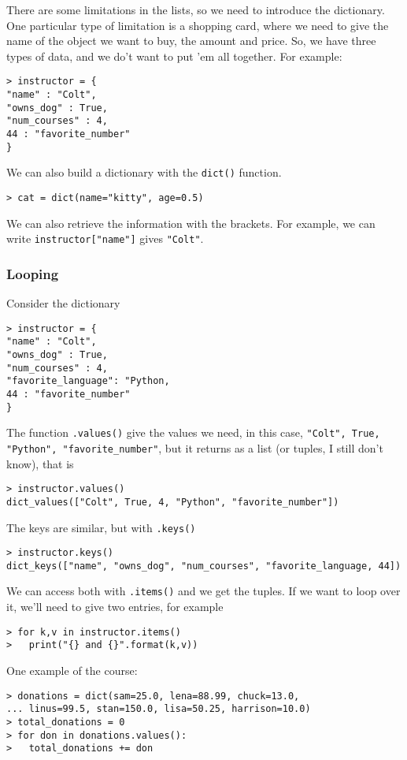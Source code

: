 There are some limitations in the lists, so we need to introduce the dictionary. One particular type of limitation is a shopping card, where we need to give the name of the object we want to buy, the amount and price. So, we have three types of data, and we do't want to put 'em all together. For example:
\begin{verbatim}
> instructor = {
"name" : "Colt", 
"owns_dog" : True,
"num_courses" : 4, 
44 : "favorite_number"
}
\end{verbatim}
We can also build a dictionary with the \verb|dict()| function. 
\begin{verbatim}
> cat = dict(name="kitty", age=0.5)
\end{verbatim}
We can also retrieve the information with the brackets. For example, we can write \verb|instructor["name"]| gives \verb|"Colt"|.

\subsubsection{Looping} Consider the dictionary
\begin{verbatim}
> instructor = {
"name" : "Colt", 
"owns_dog" : True,
"num_courses" : 4, 
"favorite_language": "Python,
44 : "favorite_number"
}
\end{verbatim}
The function \verb|.values()| give the values we need, in this case, \verb|"Colt", True, "Python", "favorite_number"|, but it returns as a list (or tuples, I still don't know), that is 
\begin{verbatim}
> instructor.values()
dict_values(["Colt", True, 4, "Python", "favorite_number"])
\end{verbatim}

The keys are similar, but with \verb|.keys()|
\begin{verbatim}
> instructor.keys()
dict_keys(["name", "owns_dog", "num_courses", "favorite_language, 44])
\end{verbatim}

We can access both with \verb|.items()| and we get the tuples. If we want to loop over it, we'll need to give two entries, for example
\begin{verbatim}
> for k,v in instructor.items()
> 	print("{} and {}".format(k,v))
\end{verbatim}

One example of the course:
\begin{verbatim}
> donations = dict(sam=25.0, lena=88.99, chuck=13.0, 
... linus=99.5, stan=150.0, lisa=50.25, harrison=10.0)
> total_donations = 0
> for don in donations.values():
> 	total_donations += don
\end{verbatim}


